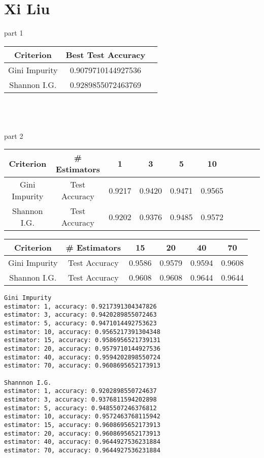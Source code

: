 \documentclass[12pt, border = 4pt, multi]{article} %
\begin{document}
\section*{Xi Liu}
part 1
{\huge
\begin{center}
\begin{tabular}{|c|c|c|}\hline
Criterion & Best Test Accuracy\\\hline
Gini Impurity & 0.9079710144927536\\\hline
Shannon I.G. & 0.9289855072463769\\\hline
\end{tabular}
\end{center}
}
\leavevmode
\\
\\
\\
part 2
\begin{center}
\begin{tabular}{|c|c|c|c|c|c|c|c|c|c|}\hline
Criterion & \# Estimators & 1 & 3 & 5 & 10\\\hline
Gini Impurity & Test Accuracy & 0.9217 & 0.9420 & 0.9471 & 0.9565\\\hline
Shannon I.G. & Test Accuracy & 0.9202 & 0.9376 & 0.9485 & 0.9572\\\hline
\end{tabular}
\end{center}
\begin{center}
\begin{tabular}{|c|c|c|c|c|c|}\hline
Criterion & \# Estimators & 15 & 20 & 40 & 70\\\hline
Gini Impurity & Test Accuracy & 0.9586 & 0.9579 & 0.9594 & 0.9608\\\hline
Shannon I.G. & Test Accuracy & 0.9608 & 0.9608 & 0.9644 & 0.9644\\\hline
\end{tabular}
\end{center}
\begin{verbatim}
Gini Impurity
estimator: 1, accuracy: 0.9217391304347826
estimator: 3, accuracy: 0.9420289855072463
estimator: 5, accuracy: 0.9471014492753623
estimator: 10, accuracy: 0.9565217391304348
estimator: 15, accuracy: 0.9586956521739131
estimator: 20, accuracy: 0.9579710144927536
estimator: 40, accuracy: 0.9594202898550724
estimator: 70, accuracy: 0.9608695652173913

Shannnon I.G.
estimator: 1, accuracy: 0.9202898550724637
estimator: 3, accuracy: 0.9376811594202898
estimator: 5, accuracy: 0.9485507246376812
estimator: 10, accuracy: 0.9572463768115942
estimator: 15, accuracy: 0.9608695652173913
estimator: 20, accuracy: 0.9608695652173913
estimator: 40, accuracy: 0.9644927536231884
estimator: 70, accuracy: 0.9644927536231884
\end{verbatim}
\end{document}
